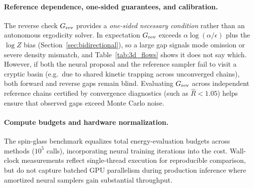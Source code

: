 \paragraph{Reference dependence, one-sided guarantees, and calibration.}
The reverse check $G_{\rm rev}$ provides a \emph{one-sided necessary condition} rather than an autonomous ergodicity solver. In expectation $G_{\rm rev}$ exceeds $\alpha\log(\alpha/\epsilon)$ plus the $\log Z$ bias (Section~\ref{sec:bidirectional}), so a large gap signals mode omission or severe density mismatch, and Table~\ref{tab:3d_flows} shows it does not say which. However, if both the neural proposal and the reference sampler fail to visit a cryptic basin (e.g.\ due to shared kinetic trapping across unconverged chains), both forward and reverse gaps remain blind. Evaluating $G_{\rm rev}$ across independent reference chains certified by convergence diagnostics (such as $\hat{R} < 1.05$) helps ensure that observed gaps exceed Monte Carlo noise.

\paragraph{Compute budgets and hardware normalization.}
The spin-glass benchmark equalizes total energy-evaluation budgets across methods ($10^5$ calls), incorporating neural training iterations into the cost. Wall-clock measurements reflect single-thread execution for reproducible comparison, but do not capture batched GPU parallelism during production inference where amortized neural samplers gain substantial throughput.
